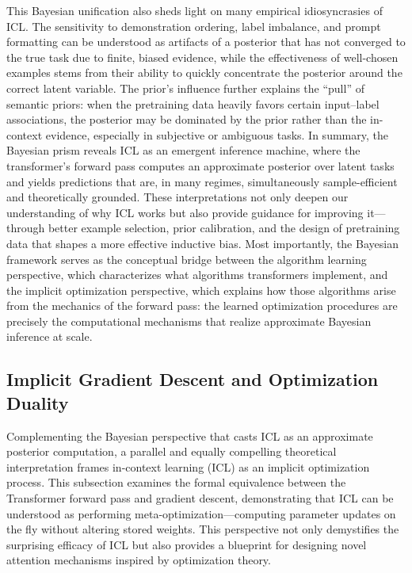 \documentclass[11pt]{article}
\begin{document}
This Bayesian unification also sheds light on many empirical idiosyncrasies of ICL. The sensitivity to demonstration ordering, label imbalance, and prompt formatting can be understood as artifacts of a posterior that has not converged to the true task due to finite, biased evidence, while the effectiveness of well-chosen examples stems from their ability to quickly concentrate the posterior around the correct latent variable. The prior's influence further explains the ``pull'' of semantic priors: when the pretraining data heavily favors certain input--label associations, the posterior may be dominated by the prior rather than the in-context evidence, especially in subjective or ambiguous tasks. In summary, the Bayesian prism reveals ICL as an emergent inference machine, where the transformer's forward pass computes an approximate posterior over latent tasks and yields predictions that are, in many regimes, simultaneously sample-efficient and theoretically grounded. These interpretations not only deepen our understanding of why ICL works but also provide guidance for improving it---through better example selection, prior calibration, and the design of pretraining data that shapes a more effective inductive bias. Most importantly, the Bayesian framework serves as the conceptual bridge between the algorithm learning perspective, which characterizes what algorithms transformers implement, and the implicit optimization perspective, which explains how those algorithms arise from the mechanics of the forward pass: the learned optimization procedures are precisely the computational mechanisms that realize approximate Bayesian inference at scale.

\subsection{Implicit Gradient Descent and Optimization Duality}

Complementing the Bayesian perspective that casts ICL as an approximate posterior computation, a parallel and equally compelling theoretical interpretation frames in-context learning (ICL) as an implicit optimization process. This subsection examines the formal equivalence between the Transformer forward pass and gradient descent, demonstrating that ICL can be understood as performing meta-optimization---computing parameter updates on the fly without altering stored weights. This perspective not only demystifies the surprising efficacy of ICL but also provides a blueprint for designing novel attention mechanisms inspired by optimization theory.
\end{document}
